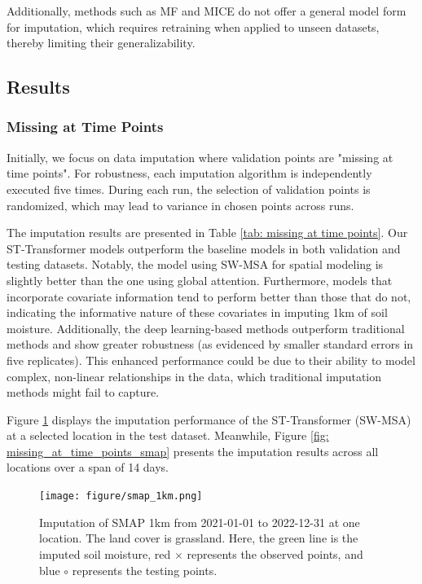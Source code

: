 \documentclass[11pt]{article}
\begin{document}
Additionally, methods such as MF and MICE do not offer a general model form for imputation, which requires retraining when applied to unseen datasets, thereby limiting their generalizability.



\subsection{Results}
\subsubsection*{Missing at Time Points}
Initially, we focus on data imputation where validation points are "missing at time points". For robustness, each imputation algorithm is independently executed five times. During each run, the selection of validation points is randomized, which may lead to variance in chosen points across runs.

The imputation results are presented in Table \ref{tab: missing at time points}. Our ST-Transformer models outperform the baseline models in both validation and testing datasets. Notably, the model using SW-MSA for spatial modeling is slightly better than the one using global attention. Furthermore, models that incorporate covariate information tend to perform better than those that do not, indicating the informative nature of these covariates in imputing 1km of soil moisture. Additionally, the deep learning-based methods outperform traditional methods and show greater robustness (as evidenced by smaller standard errors in five replicates). This enhanced performance could be due to their ability to model complex, non-linear relationships in the data, which traditional imputation methods might fail to capture. 


Figure \ref{fig: imputation_result} displays the imputation performance of the ST-Transformer (SW-MSA) at a selected location in the test dataset. Meanwhile, Figure \ref{fig: missing_at_time_points_smap} presents the imputation results across all locations over a span of 14 days.

\begin{figure}[H]
\centering
\texttt{[image: figure/smap\_1km.png]}
\caption{Imputation of SMAP 1km from 2021-01-01 to 2022-12-31 at one location. The land cover is grassland. Here, the green line is the imputed soil moisture, red $\times$ represents the observed points, and blue $\circ$ represents the testing points.}
\label{fig: imputation_result}
\end{figure}
\end{document}
